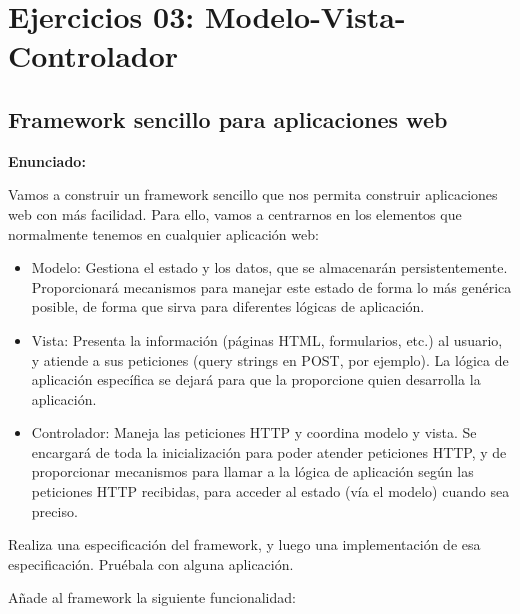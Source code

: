 \section{Ejercicios 03: Modelo-Vista-Controlador}


\subsection{Framework sencillo para aplicaciones web}
\label{subsec:framework-sencillo}

\textbf{Enunciado:}

Vamos a construir un framework sencillo que nos permita construir aplicaciones web con más facilidad. Para ello, vamos a centrarnos en los elementos que normalmente tenemos en cualquier aplicación web:

\begin{itemize}
\item Modelo: Gestiona el estado y los datos, que se almacenarán persistentemente. Proporcionará mecanismos para manejar este estado de forma lo más genérica posible, de forma que sirva para diferentes lógicas de aplicación.
\item Vista: Presenta la información (páginas HTML, formularios, etc.) al usuario, y atiende a sus peticiones (query strings en POST, por ejemplo). La lógica de aplicación específica se dejará para que la proporcione quien desarrolla la aplicación.
\item Controlador: Maneja las peticiones HTTP y coordina modelo y vista. Se encargará de toda la inicialización para poder atender peticiones HTTP, y de proporcionar mecanismos para llamar a la lógica de aplicación según las peticiones HTTP recibidas, para acceder al estado (vía el modelo) cuando sea preciso.
\end{itemize}

Realiza una especificación del framework, y luego una implementación de esa especificación. Pruébala con alguna aplicación.

Añade al framework la siguiente funcionalidad:

